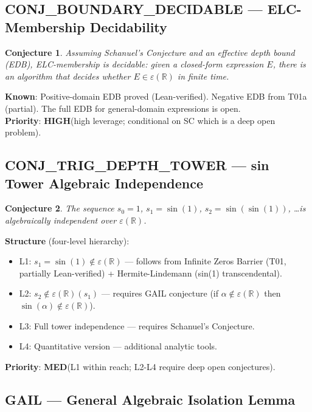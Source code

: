 \documentclass[11pt]{article}
\newtheorem{conjecture}{Conjecture}
\newcommand{\hp}{\textcolor{high}{\textbf{HIGH}}}
\newcommand{\mp}{\textcolor{med}{\textbf{MED}}}
\begin{document}
\subsection{CONJ\_BOUNDARY\_DECIDABLE — ELC-Membership Decidability}

\begin{conjecture}
Assuming Schanuel's Conjecture and an effective depth bound (EDB), ELC-membership
is decidable: given a closed-form expression $E$, there is an algorithm that
decides whether $E \in \varepsilon(\mathbb{R})$ in finite time.
\end{conjecture}

\noindent\textbf{Known}: Positive-domain EDB proved (Lean-verified). Negative EDB
from T01a (partial). The full EDB for general-domain expressions is open.\\
\textbf{Priority}: \hp (high leverage; conditional on SC which is a deep open problem).

\subsection{CONJ\_TRIG\_DEPTH\_TOWER — sin Tower Algebraic Independence}

\begin{conjecture}
The sequence $s_0 = 1$, $s_1 = \sin(1)$, $s_2 = \sin(\sin(1))$, \ldots is
algebraically independent over $\varepsilon(\mathbb{R})$.
\end{conjecture}

\noindent\textbf{Structure} (four-level hierarchy):
\begin{itemize}
\item L1: $s_1 = \sin(1) \notin \varepsilon(\mathbb{R})$ — follows from Infinite Zeros
  Barrier (T01, partially Lean-verified) + Hermite-Lindemann (sin(1) transcendental).
\item L2: $s_2 \notin \varepsilon(\mathbb{R})(s_1)$ — requires GAIL conjecture
  (if $\alpha \notin \varepsilon(\mathbb{R})$ then $\sin(\alpha) \notin \varepsilon(\mathbb{R})$).
\item L3: Full tower independence — requires Schanuel's Conjecture.
\item L4: Quantitative version — additional analytic tools.
\end{itemize}
\textbf{Priority}: \mp (L1 within reach; L2-L4 require deep open conjectures).

\subsection{GAIL — General Algebraic Isolation Lemma}
\end{document}
